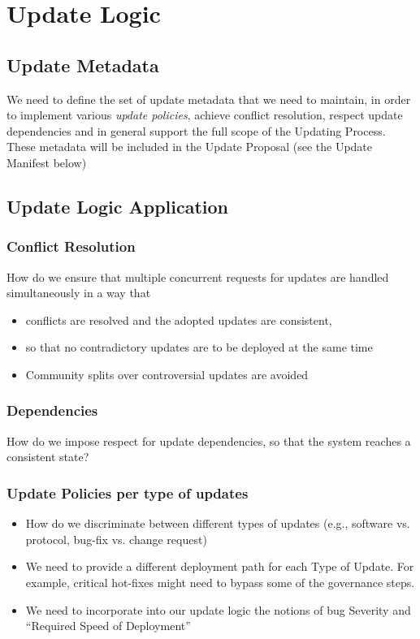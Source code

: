\section{Update Logic}
\subsection*{Update Metadata} 
We need to define the set of update metadata that we need to maintain, in order to implement various \emph{update policies}, achieve conflict resolution, respect update dependencies and in general support the full scope of the Updating Process. These metadata will be included in the Update Proposal (see the Update Manifest below)

\subsection*{Update Logic Application}
\subsubsection*{Conflict Resolution}
How do we ensure that multiple concurrent requests for updates are handled simultaneously in a way that
\begin{itemize}
\item conflicts are resolved and the adopted updates are consistent, 
\item so that no contradictory updates are to be deployed at the same time
\item Community splits over controversial updates are avoided
\end{itemize}

\subsubsection*{Dependencies}
How do we impose respect for update dependencies, so that the system reaches a consistent state? 

\subsubsection*{Update Policies per type of updates}
\begin{itemize}
\item How do we discriminate between different types of updates (e.g., software vs. protocol, bug-fix vs. change request)
\item We need to provide a different deployment path for each Type of Update. For example, critical hot-fixes might need to bypass some of the governance steps.
\item We need to incorporate into our update logic the notions of bug Severity and “Required Speed of Deployment”
\end{itemize}

